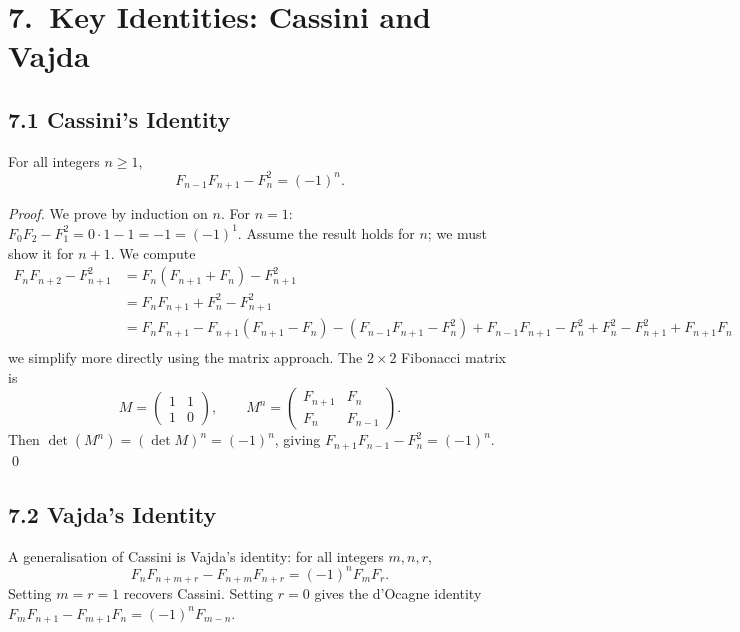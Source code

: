 \section{7.\ Key Identities: Cassini and Vajda}
\label{sec:gc-identities}

\subsection{7.1 Cassini's Identity}
\label{subsec:gc-cassini}

\begin{theorem}
\label{thm:gc-cassini}
For all integers $n \geq 1$,
\[
  F_{n-1} F_{n+1} - F_n^2 = (-1)^n.
\]
\end{theorem}

\begin{proof}
We prove by induction on $n$.
For $n=1$: $F_0 F_2 - F_1^2 = 0\cdot 1 - 1 = -1 = (-1)^1$.
Assume the result holds for $n$; we must show it for $n+1$.
We compute
\begin{align*}
  F_n F_{n+2} - F_{n+1}^2
  &= F_n (F_{n+1} + F_n) - F_{n+1}^2 \\
  &= F_n F_{n+1} + F_n^2 - F_{n+1}^2 \\
  &= F_n F_{n+1} - F_{n+1}(F_{n+1}-F_n) - (F_{n-1}F_{n+1}-F_n^2)
    + F_{n-1}F_{n+1} - F_n^2 + F_n^2
    - F_{n+1}^2 + F_{n+1}F_n \\
\end{align*}
we simplify more directly using the matrix approach.
The $2\times 2$ Fibonacci matrix is
\[
  M = \begin{pmatrix} 1 & 1 \\ 1 & 0 \end{pmatrix},
  \qquad
  M^n = \begin{pmatrix} F_{n+1} & F_n \\ F_n & F_{n-1} \end{pmatrix}.
\]
Then $\det(M^n) = (\det M)^n = (-1)^n$, giving
$F_{n+1}F_{n-1} - F_n^2 = (-1)^n$.
\qed
\end{proof}

\subsection{7.2 Vajda's Identity}
\label{subsec:gc-vajda}

A generalisation of Cassini is Vajda's identity:
for all integers $m, n, r$,
\[
  F_n F_{n+m+r} - F_{n+m} F_{n+r}
  = (-1)^n F_m F_r.
\]
Setting $m=r=1$ recovers Cassini.
Setting $r=0$ gives the d'Ocagne identity
$F_m F_{n+1} - F_{m+1} F_n = (-1)^n F_{m-n}$.


